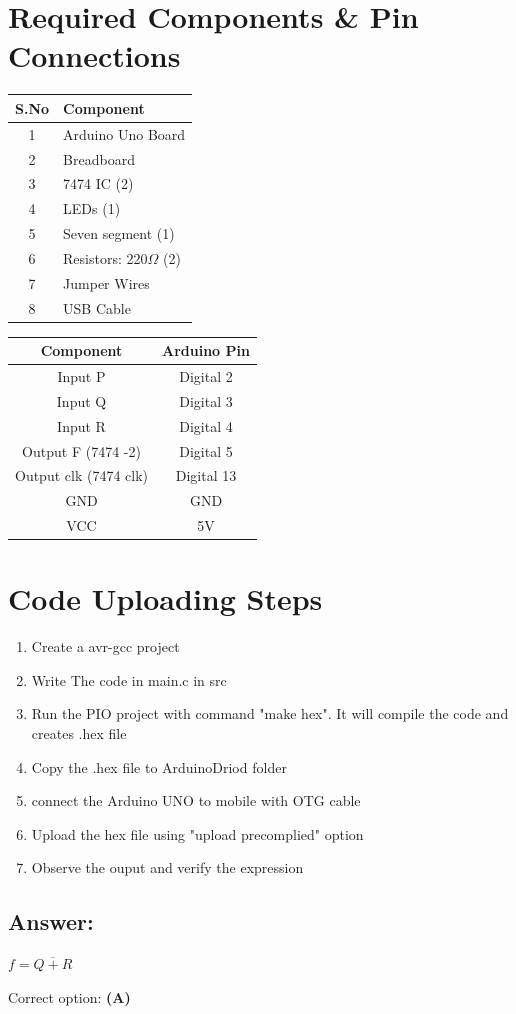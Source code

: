 \documentclass[a4paper,12pt]{article}
\begin{document}
\section*{Required Components \& Pin Connections}
\begin{center}
\begin{minipage}{0.45\textwidth}
\begin{table}[H]
\centering
\begin{tabular}{|c|l|}
\hline
\textbf{S.No} & \textbf{Component} \\ \hline
1 & Arduino Uno Board \\
2 & Breadboard \\
3 & 7474 IC (2) \\
4 & LEDs (1) \\
5 & Seven segment (1) \\
6 & Resistors: 220$\Omega$ (2) \\
7 & Jumper Wires \\
8 & USB Cable \\
\hline
\end{tabular}
\end{table}
\end{minipage}
\hspace{0.05\textwidth}
\begin{minipage}{0.45\textwidth}
\begin{table}[H]
\centering
\begin{tabular}{|c|c|}
\hline
\textbf{Component} & \textbf{Arduino Pin} \\ \hline
Input P  & Digital 2 \\
Input Q  & Digital 3 \\
Input R  & Digital 4 \\
Output F (7474 -2) & Digital 5 \\
Output clk (7474 clk) & Digital 13 \\
GND & GND \\
VCC & 5V \\
\hline
\end{tabular}
\end{table}
\end{minipage}
\end{center}
\section*{Code Uploading Steps}
\begin{enumerate}
	\item Create a avr-gcc  project
	\item Write The code in main.c in src
	\item Run the PIO project with command "make hex". It will compile the code and creates .hex file
	\item Copy the .hex file to ArduinoDriod folder
	\item connect the Arduino UNO to mobile with OTG cable
	\item Upload the hex file using "upload precomplied" option
	\item Observe the ouput and verify the expression
\end{enumerate}

\subsection*{Answer:}

$
\boxed{f = \overline{Q + R}}
$

Correct option: \textbf{(A)}
\end{document}
